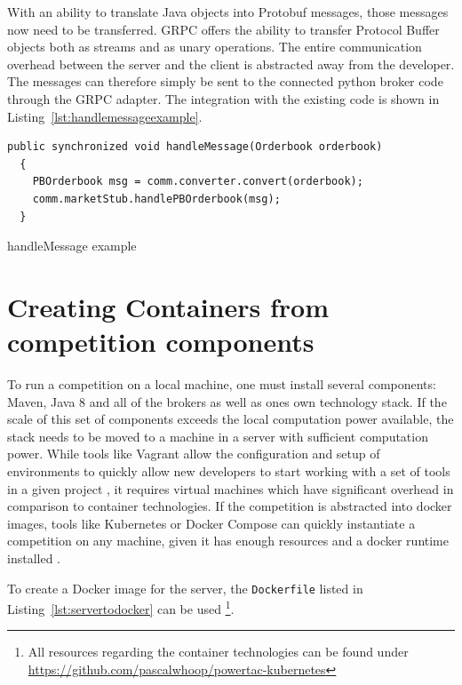 With an ability to translate Java objects into Protobuf messages, those messages now need to be transferred. \ac {GRPC}
offers the ability to transfer Protocol Buffer objects both as streams and as unary operations. The entire communication
overhead between the server and the client is abstracted away from the developer. The messages can therefore simply be
sent to the connected python broker code through the \ac {GRPC} adapter. The integration with the existing code is shown
in Listing~\ref{lst:handlemessageexample}.

\begin{listing}
\begin{verbatim}
public synchronized void handleMessage(Orderbook orderbook)
  {
    PBOrderbook msg = comm.converter.convert(orderbook);
    comm.marketStub.handlePBOrderbook(msg);
  }
\end{verbatim}
\caption{handleMessage example}
\label{lst:handlemessageexample}
\end{listing}




\section{Creating Containers from competition components}
\label{sec:creating_containers_from_competition_components}

To run a competition on a local machine, one must install several components: Maven, Java 8 and all of the brokers as
well as ones own technology stack. If the scale of this set of components exceeds the local computation power available,
the stack needs to be moved to a machine in a server with sufficient computation power. While tools like Vagrant allow
the configuration and setup of environments to quickly allow new developers to start working with a set of tools in a
given project \citep{vagrant} , it requires virtual machines which have significant overhead in comparison to container
technologies. If the competition is abstracted into docker images, tools like Kubernetes or Docker Compose can quickly
instantiate a competition on any machine, given it has enough resources and a docker runtime installed \citep{docker}.

To create a Docker image for the server, the \texttt{Dockerfile} listed in Listing~\ref{lst:servertodocker} can be used
\footnote{All resources regarding the container technologies can be found under
\url{https://github.com/pascalwhoop/powertac-kubernetes}}.


